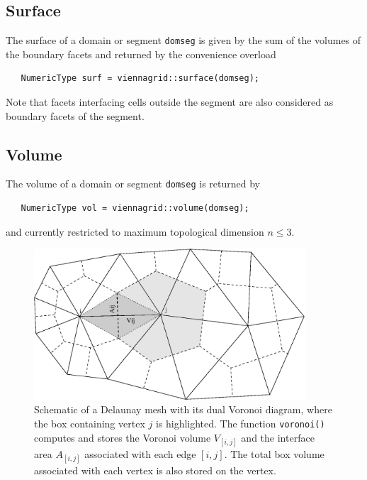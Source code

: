 
 \subsection{Surface}
 The surface of a domain or segment \lstinline|domseg| is given by the sum of the volumes of the boundary facets and returned by the convenience overload
  \begin{lstlisting}
   NumericType surf = viennagrid::surface(domseg);
  \end{lstlisting}
  Note that facets interfacing cells outside the segment are also considered as boundary facets of the segment.


  \subsection{Volume}
  The volume of a domain or segment \lstinline|domseg| is returned by
  \begin{lstlisting}
   NumericType vol = viennagrid::volume(domseg);
  \end{lstlisting}
  and currently restricted to maximum topological dimension $n \leq 3$.



\begin{figure}[tb]
\centering
 \includegraphics[width=0.9\textwidth]{figures/voronoi.eps}
 \caption{Schematic of a Delaunay mesh with its dual Voronoi diagram, where the box containing vertex $j$ is highlighted.
    The function \lstinline|voronoi()| computes and stores the Voronoi volume $V_{[i,j]}$ and the interface area $A_{[i,j]}$ associated with each edge $[i,j]$.
    The total box volume associated with each vertex is also stored on the vertex.}
 \label{fig:voronoi}
\end{figure}


